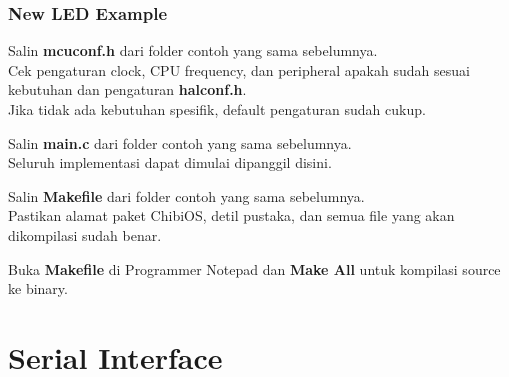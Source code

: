 \documentclass[table,dvipsnames]{beamer}
\begin{document}
	\begin{frame}
		\frametitle{New LED Example}
		\begin{exampleblock}{}
			Salin \textbf{mcuconf.h} dari folder contoh yang sama sebelumnya.\\
			Cek pengaturan clock, CPU frequency, dan peripheral apakah sudah sesuai kebutuhan dan pengaturan \textbf{halconf.h}.\\
			Jika tidak ada kebutuhan spesifik, default pengaturan sudah cukup.
		\end{exampleblock}

		\begin{exampleblock}{}
			Salin \textbf{main.c} dari folder contoh yang sama sebelumnya.\\
			Seluruh implementasi dapat dimulai dipanggil disini.
		\end{exampleblock}

		\begin{exampleblock}{}
			Salin \textbf{Makefile} dari folder contoh yang sama sebelumnya.\\
			Pastikan alamat paket ChibiOS, detil pustaka, dan semua file yang akan dikompilasi sudah benar.
		\end{exampleblock}

		\begin{exampleblock}{}
			Buka \textbf{Makefile} di Programmer Notepad dan \textbf{Make All} untuk kompilasi source ke binary.
		\end{exampleblock}
	\end{frame}

	\section{Serial Interface}
\end{document}
